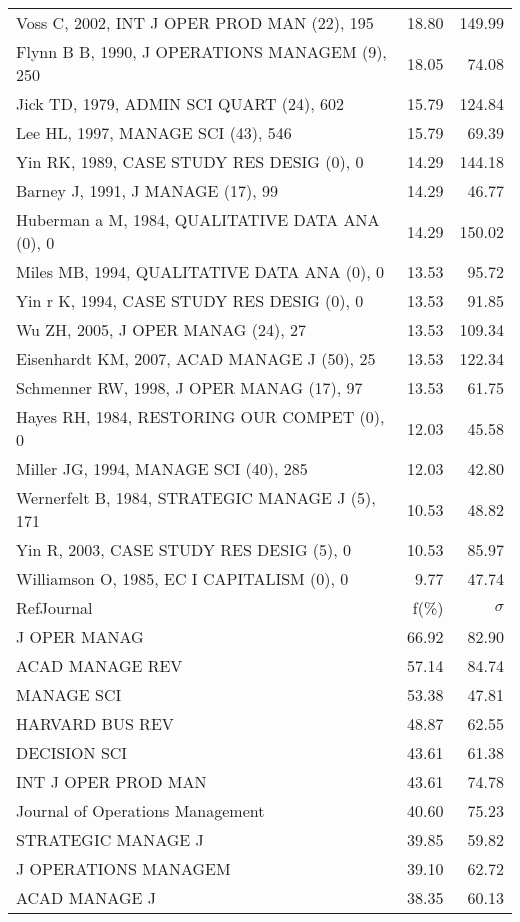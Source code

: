 \documentclass[a4paper,11pt]{report}
\begin{document}
\begin{landscape}
\begin{table}[!ht]
{\begin{tabular}{|l r r|}
Voss C, 2002, INT J OPER PROD MAN (22), 195 & 18.80 & 149.99\\
Flynn B B, 1990, J OPERATIONS MANAGEM (9), 250 & 18.05 & 74.08\\
Jick TD, 1979, ADMIN SCI QUART (24), 602 & 15.79 & 124.84\\
Lee HL, 1997, MANAGE SCI (43), 546 & 15.79 & 69.39\\
Yin RK, 1989, CASE STUDY RES DESIG (0), 0 & 14.29 & 144.18\\
Barney J, 1991, J MANAGE (17), 99 & 14.29 & 46.77\\
Huberman a M, 1984, QUALITATIVE DATA ANA (0), 0 & 14.29 & 150.02\\
Miles MB, 1994, QUALITATIVE DATA ANA (0), 0 & 13.53 & 95.72\\
Yin r K, 1994, CASE STUDY RES DESIG (0), 0 & 13.53 & 91.85\\
Wu ZH, 2005, J OPER MANAG (24), 27 & 13.53 & 109.34\\
Eisenhardt KM, 2007, ACAD MANAGE J (50), 25 & 13.53 & 122.34\\
Schmenner RW, 1998, J OPER MANAG (17), 97 & 13.53 & 61.75\\
Hayes RH, 1984, RESTORING OUR COMPET (0), 0 & 12.03 & 45.58\\
Miller JG, 1994, MANAGE SCI (40), 285 & 12.03 & 42.80\\
Wernerfelt B, 1984, STRATEGIC MANAGE J (5), 171 & 10.53 & 48.82\\
Yin R, 2003, CASE STUDY RES DESIG (5), 0 & 10.53 & 85.97\\
Williamson O, 1985, EC I CAPITALISM (0), 0 & 9.77 & 47.74\\
\hline
\hline
RefJournal & f(\%) & $\sigma$\\
\hline
J OPER MANAG & 66.92 & 82.90\\
ACAD MANAGE REV & 57.14 & 84.74\\
MANAGE SCI & 53.38 & 47.81\\
HARVARD BUS REV & 48.87 & 62.55\\
DECISION SCI & 43.61 & 61.38\\
INT J OPER PROD MAN & 43.61 & 74.78\\
Journal of Operations Management & 40.60 & 75.23\\
STRATEGIC MANAGE J & 39.85 & 59.82\\
J OPERATIONS MANAGEM & 39.10 & 62.72\\
ACAD MANAGE J & 38.35 & 60.13\\
\hline
\end{tabular}
}
\end{table}


\end{landscape}
\end{document}
